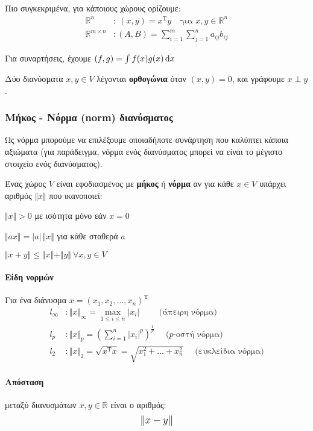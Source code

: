 \documentclass[11pt,a4paper,notitlepage,fleqn]{article}
\begin{document}
	Πιο συγκεκριμένα, για κάποιους χώρους ορίζουμε:
	\begin{align*}
	\mathbb R^n &: \ (x,y) = x^{\mathrm T}y \quad
	\text{για } x,y \in \mathbb R^n
	\\
	\mathbb R^{m\times n} &: (A,B) =
	\sum_{i=1}^{m}\sum_{j=1}^{n} a_{ij}b_{ij}
	\end{align*}
	
	Για συναρτήσεις, έχουμε \( (f,g) = \int f(x)g(x)\mathop{}\!\mathrm{d} x \)
	
	Δύο διανύσματα \( x,y \in V \) λέγονται \textbf{ορθογώνια} όταν
	\( (x,y) = 0\), και γράφουμε \( x \perp y \).
	
	\subsubsection{Μήκος - Νόρμα (norm) διανύσματος}
	Ως νόρμα μπορούμε να επιλέξουμε οποιαδήποτε συνάρτηση που καλύπτει
	κάποια αξιώματα (για παράδειγμα, νόρμα ενός διανύσματος μπορεί να
	είναι το μέγιστο στοιχείο ενός διανύσματος).
	
	Ένας χώρος \( V \) είναι εφοδιασμένος με \textbf{μήκος} ή
	\textbf{νόρμα} αν για κάθε \( x \in V \) υπάρχει αριθμός
	\( \Vert x\Vert \) που ικανοποιεί:
	
	\begin{enumroman}
		\item \( \Vert x\Vert > 0 \) με ισότητα μόνο εάν \( x=0 \)
		\item \( \Vert ax\Vert = |a|\,\Vert x\Vert \) για κάθε σταθερά \( a \)
		\item \( \Vert x+y\Vert \leq \Vert x\Vert+\Vert y\Vert \ \forall x,y\in V  \)
	\end{enumroman}
	
	\paragraph{Είδη νορμών}
	Για ένα διάνυσμα \( x=(x_1,x_2,\dots,x_n)^{\mathrm T} \)
	\begin{align*}
		l_{\infty} &: \Vert x\Vert _{\infty} = \max_{1\leq i \leq n}|x_i|
		\qquad \text{ (άπειρη νόρμα)}
		\\
		l_p &: \Vert x\Vert _{p} =
		\left(\sum_{i=1}^n |x_i|^p\right)^{\frac{1}{p}}
		\quad \text{ ($p$-οστή νόρμα)}
		\\
		l_2 &: \Vert x\Vert _2 = \sqrt{x^{\mathrm T}x} =
		\sqrt{x_1^2 + \dots + x_n^2}
		\quad \text{ (ευκλείδια νόρμα)}
	\end{align*}
	
	\paragraph{Απόσταση}
	μεταξύ διανυσμάτων \( x,y \in \mathbb R  \) είναι ο αριθμός:
	\[
    \mathlarger{\Vert x-y\Vert }
	\]
	
\end{document}
